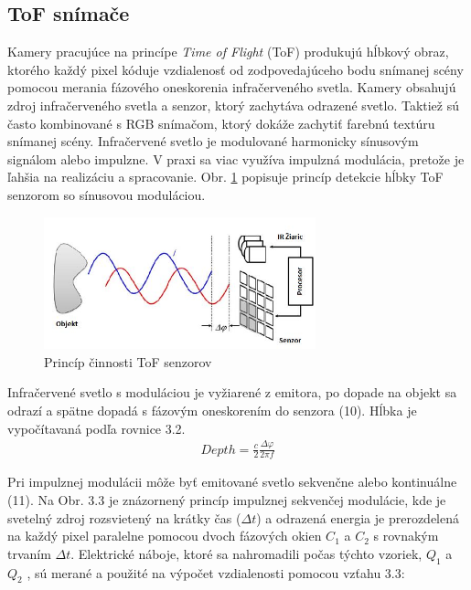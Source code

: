 \subsection{ToF snímače}
\label{sec:tof}
Kamery pracujúce na princípe \textit{Time of Flight} (ToF) produkujú hĺbkový obraz, ktorého každý pixel kóduje vzdialenosť od zodpovedajúceho bodu snímanej scény pomocou merania fázového oneskorenia infračerveného svetla. Kamery obsahujú zdroj infračerveného svetla a senzor, ktorý zachytáva odrazené svetlo. Taktiež sú často kombinované s RGB snímačom, ktorý dokáže zachytiť farebnú textúru snímanej scény. Infračervené svetlo je modulované harmonicky sínusovým signálom alebo impulzne. V praxi sa viac využíva impulzná modulácia, pretože je ľahšia na realizáciu a spracovanie. Obr. \ref{fig:tof_principle} popisuje princíp detekcie hĺbky ToF senzorom so sínusovou moduláciou.

\begin{figure}[h]
	\centering
	\includegraphics[width=0.7\textwidth]{figures/tof_principle.png} 
	\caption{Princíp činnosti ToF senzorov}
	\label{fig:tof_principle}
\end{figure}

Infračervené svetlo s moduláciou je vyžiarené z emitora, po dopade na objekt sa odrazí a spätne dopadá s fázovým oneskorením do senzora (10). Hĺbka je vypočítavaná podľa rovnice 3.2.
\begin{equation}
\label{eq2}
\begin{aligned}
Depth=\frac{c}{2}\frac{\Delta \varphi}{2 \pi f}
\end{aligned}
\end{equation}

Pri impulznej modulácii môže byť emitované svetlo sekvenčne alebo kontinuálne (11). Na Obr. 3.3 je znázornený princíp impulznej sekvenčej modulácie, kde je svetelný zdroj rozsvietený na krátky čas ($ \Delta t $) a odrazená energia je prerozdelená na každý pixel paralelne pomocou dvoch fázových okien $C_1$ a $C_2$ s rovnakým trvaním $ \Delta t $. Elektrické náboje, ktoré sa nahromadili počas týchto vzoriek, $Q_1$ a $Q_2$ , sú merané a použité na výpočet vzdialenosti pomocou vzťahu 3.3:

